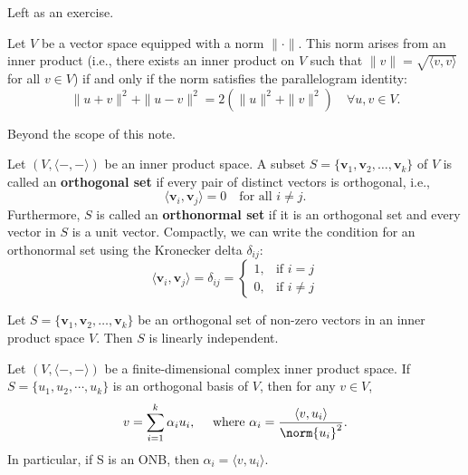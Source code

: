 \begin{pfbox}
    Left as an exercise.
\end{pfbox}

\begin{theorem}
    Let $V$ be a vector space equipped with a norm $\|\cdot\|$. 
    This norm arises from an inner product (i.e., there exists an inner product on $V$ such that $\|v\| = \sqrt{\langle v,v\rangle}$ for all $v\in V$) if and only if the norm satisfies the parallelogram identity:
    $$ \|u+v\|^2 + \|u-v\|^2 = 2(\|u\|^2 + \|v\|^2) \quad \forall u,v\in V. $$
\end{theorem}

\begin{pfbox}
    Beyond the scope of this note.
\end{pfbox}

\begin{definition}
    Let $(V,\langle-,-\rangle)$ be an inner product space. A subset $S = \{\mathbf{v}_1, \mathbf{v}_2, \dots, \mathbf{v}_k\}$ of $V$ is called an \textbf{orthogonal set} if every pair of distinct vectors is orthogonal, i.e.,
    $$ \langle \mathbf{v}_i, \mathbf{v}_j \rangle = 0 \quad \text{for all } i \neq j. $$
    Furthermore, $S$ is called an \textbf{orthonormal set} if it is an orthogonal set and every vector in $S$ is a unit vector. Compactly, we can write the condition for an orthonormal set using the Kronecker delta $\delta_{ij}$:
    $$ \langle \mathbf{v}_i, \mathbf{v}_j \rangle = \delta_{ij} = \begin{cases} 1, & \text{if } i = j \\ 0, & \text{if } i \neq j \end{cases} $$
\end{definition}

\begin{theorem}
    Let $S = \{\mathbf{v}_1, \mathbf{v}_2, \dots, \mathbf{v}_k\}$ be an orthogonal set of non-zero vectors in an inner product space $V$. Then $S$ is linearly independent.
\end{theorem}

\begin{theorem}
Let $(V,\langle-,-\rangle)$ be a finite-dimensional complex inner product space.
If $S=\{u_1,u_2,\cdots,u_k\}$ is an orthogonal basis of $V$, then for any $v\in V$,
$$v=\sum_{i=1}^{k}\alpha_i u_i, \quad \text{ where } \alpha_i=\frac{\langle v, u_i\rangle}{\norm{u_i}^2}.$$
In particular, if S is an ONB, then $\alpha_i=\langle v, u_i\rangle.$
\end{theorem}

